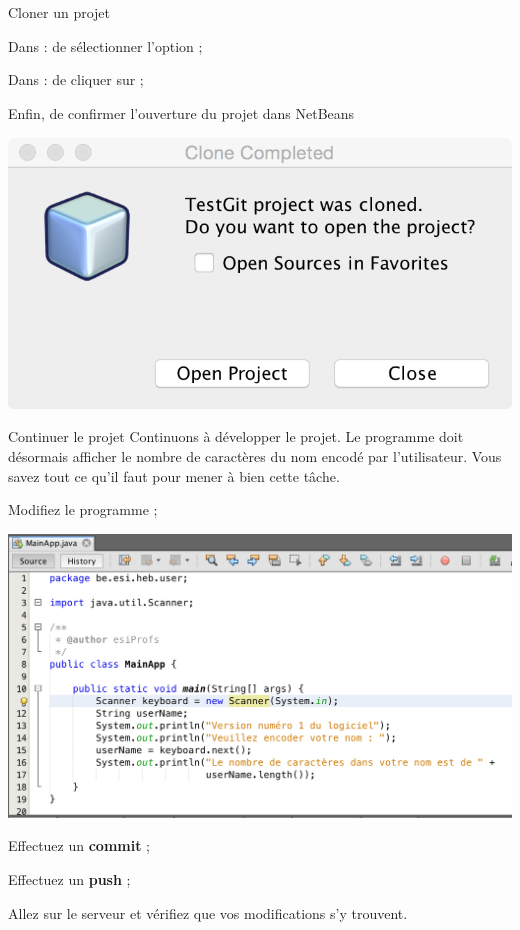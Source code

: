 \documentclass[a4paper,11pt]{style-esi/td}
\begin{document}
\begin{Tutoriel}{Cloner un projet}
\begin{steps}
\begin{steps}
\begin{center}
			\end{center}
		\item
			Dans  : 
			de sélectionner l'option  ;
		\item
			Dans  :
			de cliquer sur  ;
		\item 
			Enfin, de confirmer l'ouverture du projet dans NetBeans
			\begin{center}
				\includegraphics[width=.4\textwidth]{image/NetBeans_clone06.png}
			\end{center}			
		\end{steps}
	\end{steps}
\end{Tutoriel}
	
\begin{Tutoriel}{Continuer le projet}
	Continuons à développer le projet.
	Le programme doit désormais 
	afficher le nombre de caractères du nom encodé par l'utilisateur.
	Vous savez tout ce qu'il faut pour mener à bien cette tâche.
	\begin{steps}
		\item 
			Modifiez le programme ;
			\begin{center}
				\includegraphics[width=.7\textwidth]{image/NetBeans_Project_10.png}
			\end{center}		
		\item 
			Effectuez un \textbf{commit} ;	
		\item 
			Effectuez un \textbf{push} ;
		\item 
			Allez sur le serveur et vérifiez que vos modifications s'y trouvent.
	\end{steps}
\end{Tutoriel}
	
\end{document}
